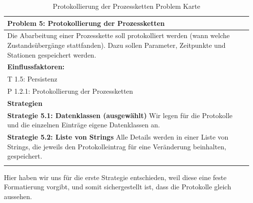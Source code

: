 \documentclass[enabledeprecatedfontcommands,fontsize=12pt,paper=a4,twoside]{scrartcl}
\begin{document}
\begin{table}[H]
    \centering
    \begin{tabular}{|p{15cm}|}
    \hline
          \textbf{Problem 5:} Protokollierung der Prozessketten
          \\ \hline
          Die Abarbeitung einer Prozesskette soll protokolliert werden (wann welche Zustandsübergänge stattfanden). Dazu sollen Parameter, Zeitpunkte und Stationen gespeichert werden. %
          \\ \hline
          \textbf{Einflussfaktoren: } \\
          T 1.5: Persistenz \\
          P 1.2.1: Protokollierung der Prozessketten\\
          \hline
          \textbf{Strategien} \\ \hline
            {}          
           \label{strategie:5.1}     
	\textbf{Strategie 5.1: Datenklassen (ausgewählt)} Wir legen für die Protokolle und die einzelnen Einträge eigene Datenklassen an.\\
	  {}          
           \label{strategie:5.2}     
        \textbf{Strategie 5.2: Liste von Strings} Alle Details werden in einer Liste von Strings, die jeweils den Protokolleintrag für eine Veränderung beinhalten, gespeichert. \\
          \\ \hline
    \end{tabular}

    \caption{Protokollierung der Prozessketten Problem Karte}

    \label{tab:ProblemKarte5}
\end{table}

Hier haben wir uns  für die erste Strategie entschieden, weil diese eine feste Formatierung vorgibt, und somit sichergestellt ist, dass die Protokolle gleich aussehen.\\
\end{document}
